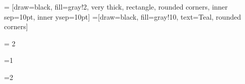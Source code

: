 \documentclass[xcolor=table,9pt,notes,t]{beamer} %
\newcommand{\AspectRatio}{1}
\begin{document}
 = [draw=black, fill=gray!2, very thick, rectangle, rounded corners, inner sep=10pt, inner ysep=10pt]
 =[draw=black, fill=gray!10, text=Teal, rounded corners] 

\newcommand{\Week}{2} 

\ifnum \Week = 2
\fi


\ifnum \AspectRatio=1

\fi
\ifnum \AspectRatio=2


\fi
\end{document}
